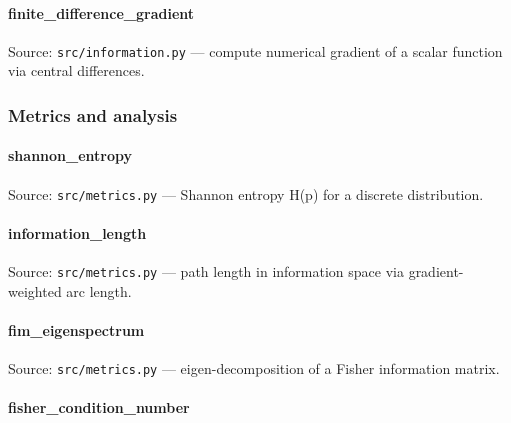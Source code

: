 \documentclass[
  10pt,
]{article}
\newcommand{\passthrough}[1]{#1}
\renewcommand{\texttt}[1]{%
    \colorbox{codebg}{\color{codefg}\ttfamily #1}%
}
\begin{document}
\hypertarget{code:finite_difference_gradient}{%
\paragraph{\texorpdfstring{\texttt{finite\_difference\_gradient}}{finite\_difference\_gradient}}\label{code:finite_difference_gradient}}

Source: \passthrough{\lstinline!src/information.py!} --- compute
numerical gradient of a scalar function via central differences.

\hypertarget{code:metrics}{%
\subsubsection{Metrics and analysis}\label{code:metrics}}

\hypertarget{code:shannon_entropy}{%
\paragraph{\texorpdfstring{\texttt{shannon\_entropy}}{shannon\_entropy}}\label{code:shannon_entropy}}

Source: \passthrough{\lstinline!src/metrics.py!} --- Shannon entropy
H(p) for a discrete distribution.

\hypertarget{code:information_length}{%
\paragraph{\texorpdfstring{\texttt{information\_length}}{information\_length}}\label{code:information_length}}

Source: \passthrough{\lstinline!src/metrics.py!} --- path length in
information space via gradient-weighted arc length.

\hypertarget{code:fim_eigenspectrum}{%
\paragraph{\texorpdfstring{\texttt{fim\_eigenspectrum}}{fim\_eigenspectrum}}\label{code:fim_eigenspectrum}}

Source: \passthrough{\lstinline!src/metrics.py!} --- eigen-decomposition
of a Fisher information matrix.

\hypertarget{code:fisher_condition_number}{%
\paragraph{\texorpdfstring{\texttt{fisher\_condition\_number}}{fisher\_condition\_number}}\label{code:fisher_condition_number}}
\end{document}
